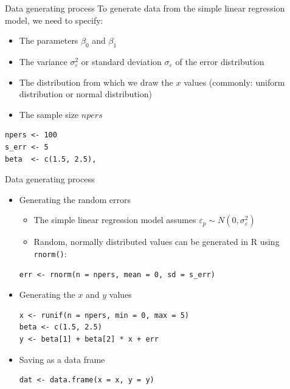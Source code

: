 \documentclass[aspectratio=169]{beamer}
\begin{document}
\begin{frame}[fragile]{Data generating process}
  To generate data from the simple linear regression model, we need to specify:
  \begin{itemize}
    \item The parameters $\beta_0$ and $\beta_1$
    \item The variance $\sigma_{\varepsilon}^2$ or standard deviation
      $\sigma_{\varepsilon}$ of the error distribution
    \item The distribution from which we draw the $x$ values (commonly: uniform
      distribution or normal distribution)
    \item The sample size $npers$
  \end{itemize}
\begin{lstlisting}
npers <- 100
s_err <- 5
beta  <- c(1.5, 2.5),
\end{lstlisting}
\end{frame}

\begin{frame}[fragile]{Data generating process}
  \begin{itemize}
    \item Generating the random errors
      \begin{itemize}
    \item The simple linear regression model assumes $\varepsilon_p \sim N(0,
      \sigma_{\varepsilon}^2)$\\
    \item Random, normally distributed values can be generated in R using
      \texttt{rnorm()}:
      \end{itemize}
\begin{lstlisting}
err <- rnorm(n = npers, mean = 0, sd = s_err)
\end{lstlisting}
    \item Generating the $x$ and $y$ values
\begin{lstlisting}
x <- runif(n = npers, min = 0, max = 5)
beta <- c(1.5, 2.5)
y <- beta[1] + beta[2] * x + err
\end{lstlisting}
    \item Saving as a data frame
\begin{lstlisting}
dat <- data.frame(x = x, y = y)
\end{lstlisting}
  \end{itemize}
\end{frame}
\end{document}
